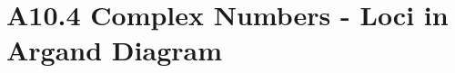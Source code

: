 \chapter{A10.4 Complex Numbers - Loci in Argand Diagram}\label{chap:A10.4}


\clearpage

\clearpage
